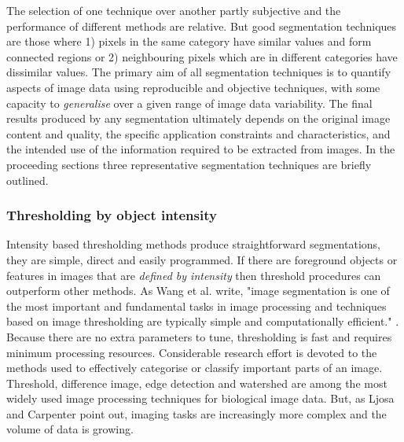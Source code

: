 The selection of one technique over another partly subjective and the performance of different methods are relative. But good segmentation techniques are those where 1) pixels in the same category have similar values and form connected regions or 2) neighbouring pixels which are in different categories have dissimilar values. The primary aim of all segmentation techniques is to quantify aspects of image data using reproducible and objective techniques, with some capacity to \emph{generalise} over a given range of image data variability. The final results produced by any segmentation ultimately depends on the original image content and quality, the specific application constraints and characteristics, and the intended use of the information required to be extracted from images. In the proceeding sections three representative segmentation techniques are briefly outlined.

\subsubsection{Thresholding by object intensity}\label{sec:thresholding-by-object-intensity}
Intensity based thresholding methods produce straightforward segmentations, they are simple, direct and easily programmed. If there are foreground objects or features in images that are \emph{defined by intensity} then threshold procedures can outperform other methods. As Wang et al. \cite{Wang2008} write, "image segmentation is one of the most important and fundamental tasks in image processing and techniques based on image thresholding are typically simple and computationally efficient." \cite[pg.117]{Wang2008}. Because there are no extra parameters to tune, thresholding is fast and requires minimum processing resources. Considerable research effort is devoted to the methods used to effectively categorise or classify important parts of an image. Threshold, difference image, edge detection and watershed are among the most widely used image processing techniques for biological image data. But, as Ljosa and Carpenter \cite{Ljosa2009} point out, imaging tasks are increasingly more complex and the volume of data is growing.

